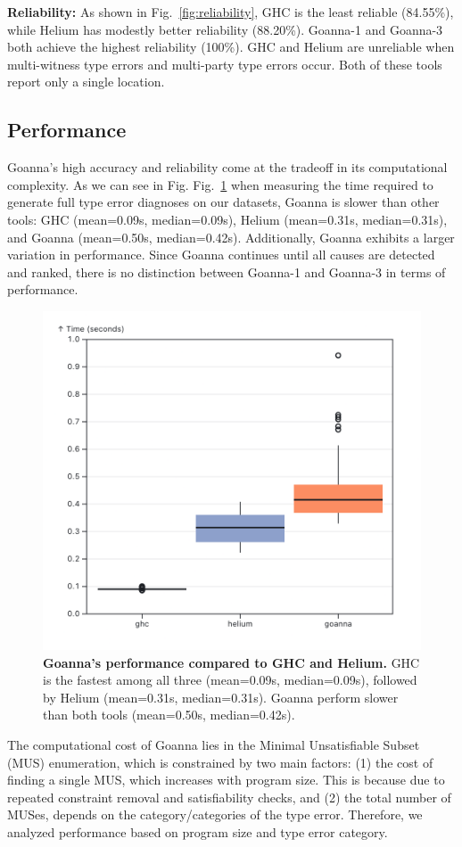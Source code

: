 \documentclass[pdflatex,lineno,sn-nature,Numbered]{sn-jnl}%
\begin{document}
\textbf{Reliability:} As shown in Fig.~\ref{fig:reliability}, GHC is the least reliable (84.55\%), while Helium has modestly better reliability (88.20\%). Goanna-1 and Goanna-3 both achieve the highest reliability (100\%). GHC and Helium are unreliable when multi-witness type errors and multi-party type errors occur. Both of these tools report only a single location. 

\subsection{Performance} \label{sub:eval-performance}
Goanna's high accuracy and reliability come at the tradeoff in its computational complexity. As we can see in Fig. Fig.~\ref{fig:performance} when measuring the time required to generate full type error diagnoses on our datasets, Goanna is slower than other tools: GHC (mean=0.09s, median=0.09s), Helium (mean=0.31s, median=0.31s), and Goanna (mean=0.50s, median=0.42s). Additionally, Goanna exhibits a larger variation in performance. Since Goanna continues until all causes are detected and ranked, there is no distinction between Goanna-1 and Goanna-3 in terms of performance.

\begin{figure}[ht!]
    \centering
    \includegraphics[width=0.7\linewidth]{images/performance-overall.png}
    \caption{{\bf Goanna's performance compared to GHC and Helium.} GHC is the fastest among all three (mean=0.09s, median=0.09s), followed by Helium (mean=0.31s, median=0.31s). Goanna perform slower than both tools (mean=0.50s, median=0.42s).}
    \label{fig:performance}
\end{figure}

The computational cost of Goanna lies in the Minimal Unsatisfiable Subset (MUS) enumeration, which is constrained by two main factors: (1) the cost of finding a single MUS, which increases with program size. This is because due to repeated constraint removal and satisfiability checks, and (2) the total number of MUSes, depends on the category/categories of the type error. Therefore, we analyzed performance based on program size and type error category.
\end{document}
